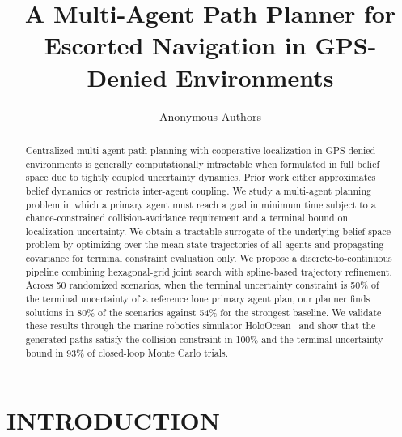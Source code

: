 \documentclass[letterpaper, 10 pt, conference]{ieeeconf}
\title{\LARGE \bf A Multi-Agent Path Planner for Escorted Navigation in GPS-Denied Environments}
\author{Anonymous Authors}
\theoremstyle{remark}
\newcommand{\budget}[1]{\textcolor{RoyalBlue}{\bfseries [BUDGET: #1]}}
\begin{document}
\maketitle
\thispagestyle{empty}
\pagestyle{empty}

\begin{abstract}
Centralized multi-agent path planning with cooperative localization in GPS-denied environments is generally computationally 
intractable when formulated in full belief space due to tightly coupled uncertainty dynamics. Prior work either approximates belief dynamics
or restricts inter-agent coupling. We study a multi-agent planning problem in which a primary agent must reach a goal in minimum time 
subject to a chance-constrained collision-avoidance requirement and a terminal bound on localization uncertainty. We obtain a tractable surrogate
of the underlying belief-space problem by optimizing over the mean-state trajectories of all agents and propagating covariance for terminal constraint evaluation only. 
We propose a discrete-to-continuous pipeline combining hexagonal-grid joint search with spline-based trajectory refinement. 
Across 50 randomized scenarios, when the terminal uncertainty constraint is 50\% of the terminal uncertainty of a reference lone primary agent plan, our planner
finds solutions in 80\% of the scenarios against 54\% for the strongest baseline. We validate these results through the marine robotics simulator HoloOcean~\cite{potokar2022holoocean} and show that
the generated paths satisfy the collision constraint in 100\% and the terminal uncertainty bound in 93\% of closed-loop Monte Carlo trials.

\end{abstract}

\section{INTRODUCTION}
\end{document}
